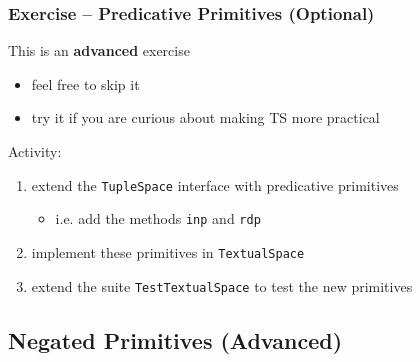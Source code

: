 \documentclass[presentation]{beamer}\mode<presentation>{\usetheme{AMSCesenaPurpleAndGold}}
\begin{document}
\begin{frame}[allowframebreaks]
	\frametitle{Exercise \currentExercise{} -- Predicative Primitives (Optional)}
	
	\begin{alertblock}{This is an \textbf{advanced} exercise}
		\begin{itemize}
			\item feel free to skip it
			\item try it if you are curious about making TS more practical
		\end{itemize}
	\end{alertblock}
	
	\bigskip
	
	Activity:
	\medskip
	\begin{enumerate}
		\item extend the \texttt{TupleSpace} interface with \alert{predicative} primitives
		\begin{itemize}
			\item i.e. add the methods \texttt{inp} and \texttt{rdp}
		\end{itemize}
	
		\medskip
		
		\item implement these primitives in \texttt{TextualSpace}
		
		\medskip
		
		\item extend the suite \texttt{TestTextualSpace} to test the new primitives
		
	\end{enumerate}
	
\end{frame}

\startExercise

\subsection{Negated Primitives (Advanced)} 
\end{document}

